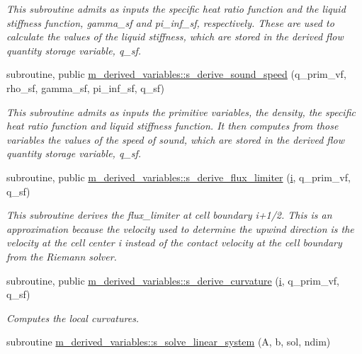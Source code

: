 \begin{Indent}
\begin{DoxyCompactItemize}
\begin{DoxyCompactList}\small\item\em This subroutine admits as inputs the specific heat ratio function and the liquid stiffness function, gamma\+\_\+sf and pi\+\_\+inf\+\_\+sf, respectively. These are used to calculate the values of the liquid stiffness, which are stored in the derived flow quantity storage variable, q\+\_\+sf. \end{DoxyCompactList}\item 
subroutine, public \hyperlink{namespacem__derived__variables_a51eb66162227584de46a25cac55b5b6b}{m\+\_\+derived\+\_\+variables\+::s\+\_\+derive\+\_\+sound\+\_\+speed} (q\+\_\+prim\+\_\+vf, rho\+\_\+sf, gamma\+\_\+sf, pi\+\_\+inf\+\_\+sf, q\+\_\+sf)
\begin{DoxyCompactList}\small\item\em This subroutine admits as inputs the primitive variables, the density, the specific heat ratio function and liquid stiffness function. It then computes from those variables the values of the speed of sound, which are stored in the derived flow quantity storage variable, q\+\_\+sf. \end{DoxyCompactList}\item 
subroutine, public \hyperlink{namespacem__derived__variables_ac85e77b0312f21389eb166960446f6ec}{m\+\_\+derived\+\_\+variables\+::s\+\_\+derive\+\_\+flux\+\_\+limiter} (\hyperlink{m__data__output_8f90_aaea4baed8fd8b780f6938f0dc1fb0f72}{i}, q\+\_\+prim\+\_\+vf, q\+\_\+sf)
\begin{DoxyCompactList}\small\item\em This subroutine derives the flux\+\_\+limiter at cell boundary i+1/2. This is an approximation because the velocity used to determine the upwind direction is the velocity at the cell center i instead of the contact velocity at the cell boundary from the Riemann solver. \end{DoxyCompactList}\item 
subroutine, public \hyperlink{namespacem__derived__variables_a2c43e6d73417e237731fdad2eea07b22}{m\+\_\+derived\+\_\+variables\+::s\+\_\+derive\+\_\+curvature} (\hyperlink{m__data__output_8f90_aaea4baed8fd8b780f6938f0dc1fb0f72}{i}, q\+\_\+prim\+\_\+vf, q\+\_\+sf)
\begin{DoxyCompactList}\small\item\em Computes the local curvatures. \end{DoxyCompactList}\item 
subroutine \hyperlink{namespacem__derived__variables_a2604318b4c2822441b485a32c755e5b6}{m\+\_\+derived\+\_\+variables\+::s\+\_\+solve\+\_\+linear\+\_\+system} (A, b, sol, ndim)

\end{DoxyCompactItemize}
\end{Indent}
